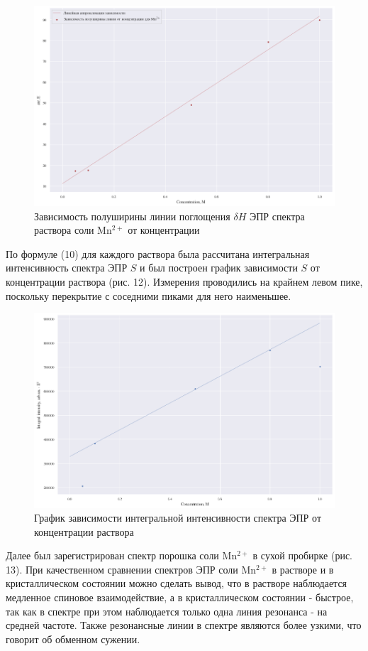 \documentclass[a4paper,14pt]{article}
\begin{document}
\begin{figure}[h]
	\centering
	\includegraphics{рис11}
	\caption{Зависимость полуширины линии поглощения $ \delta H $ ЭПР спектра раствора соли $ \mathrm{Mn^{2+}} $ от концентрации}
	\label{fig:11}
\end{figure}
\par 
По формуле (10) для каждого раствора была рассчитана интегральная интенсивность спектра ЭПР $ S $ и был построен график зависимости $ S $ от концентрации раствора (рис. 12). Измерения проводились на крайнем левом пике, поскольку перекрытие с соседними пиками для него наименьшее. 
\begin{figure}[h]
	\centering
	\includegraphics{рис12}
	\caption{График зависимости интегральной интенсивности спектра ЭПР от концентрации раствора}
	\label{fig:12}
\end{figure}
\par 
Далее был зарегистрирован спектр порошка соли $ \mathrm{Mn^{2+}} $ в сухой пробирке (рис. 13). При качественном сравнении спектров ЭПР соли $ \mathrm{Mn^{2+}} $ в растворе и в кристаллическом состоянии можно сделать вывод, что в растворе наблюдается медленное спиновое взаимодействие, а в кристаллическом состоянии - быстрое, так как в спектре при этом наблюдается только одна линия резонанса - на средней частоте. Также резонансные линии в спектре являются более узкими, что говорит об обменном сужении. 
\end{document}
